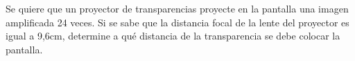 
Se quiere que un proyector de transparencias proyecte en la pantalla una imagen amplificada 24 veces. Si se sabe que la distancia focal de la lente del proyector es igual a 9,6cm, determine a qué distancia de la transparencia se debe colocar la pantalla.